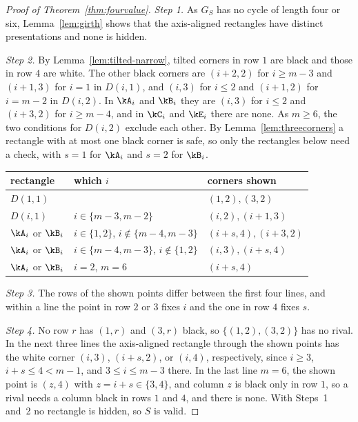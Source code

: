 \begin{proof}[Proof of Theorem~\ref{thm:fourvalue}]
\emph{Step 1.} As $G_S$ has no cycle of length four or six, Lemma~\ref{lem:girth} shows that the axis-aligned rectangles have distinct presentations and none is hidden.

\emph{Step 2.} By Lemma~\ref{lem:tilted-narrow}, tilted corners in row $1$ are black and those in row $4$ are white. The other black corners are $(i+2,2)$ for $i\ge m-3$ and $(i+1,3)$ for $i=1$ in $D(i,1)$, and $(i,3)$ for $i\le2$ and $(i+1,2)$ for $i=m-2$ in $D(i,2)$. In $\kA_i$ and $\kB_i$ they are $(i,3)$ for $i\le2$ and $(i+3,2)$ for $i\ge m-4$, and in $\kC_i$ and $\kE_i$ there are none. As $m\ge6$, the two conditions for $D(i,2)$ exclude each other. By Lemma~\ref{lem:threecorners} a rectangle with at most one black corner is safe, so only the rectangles below need a check, with $s=1$ for $\kA_i$ and $s=2$ for $\kB_i$.
\begin{center}\small
\begin{tabular}{@{}lll@{}}
\toprule
rectangle & which $i$ & corners shown\\
\midrule
$D(1,1)$ & & $(1,2),(3,2)$\\
$D(i,1)$ & $i\in\{m-3,m-2\}$ & $(i,2),(i+1,3)$\\
$\kA_i$ or $\kB_i$ & $i\in\{1,2\}$, $i\notin\{m-4,m-3\}$ & $(i+s,4),(i+3,2)$\\
$\kA_i$ or $\kB_i$ & $i\in\{m-4,m-3\}$, $i\notin\{1,2\}$ & $(i,3),(i+s,4)$\\
$\kA_i$ or $\kB_i$ & $i=2$, $m=6$ & $(i+s,4)$\\
\bottomrule
\end{tabular}
\end{center}

\emph{Step 3.} The rows of the shown points differ between the first four lines, and within a line the point in row $2$ or $3$ fixes $i$ and the one in row $4$ fixes $s$.

\emph{Step 4.} No row $r$ has $(1,r)$ and $(3,r)$ black, so $\{(1,2),(3,2)\}$ has no rival. In the next three lines the axis-aligned rectangle through the shown points has the white corner $(i,3)$, $(i+s,2)$, or $(i,4)$, respectively, since $i\ge3$, $i+s\le4<m-1$, and $3\le i\le m-3$ there. In the last line $m=6$, the shown point is $(z,4)$ with $z=i+s\in\{3,4\}$, and column $z$ is black only in row $1$, so a rival needs a column black in rows $1$ and $4$, and there is none. With Steps~1 and~2 no rectangle is hidden, so $S$ is valid.
\end{proof}

